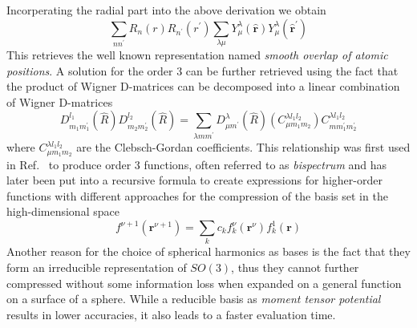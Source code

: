 Incorperating the radial part into the above derivation we obtain
\begin{equation}
  \sum_{nn^\prime} R_n(r)R_{n^\prime}(r^\prime) \sum_{\lambda\mu} Y^\lambda_\mu(\hat{\mathbf{r}})Y^\lambda_{\mu}(\hat{\mathbf{r}}^\prime)
\end{equation}
This retrieves the well known representation named \emph{smooth overlap of atomic positions}\cite{bartok2013representing}.
A solution for the order 3 can be further retrieved using the fact that the product of Wigner D-matrices can be decomposed into a linear combination of Wigner D-matrices
\begin{equation}
  D^{l_1}_{m_1m_1^\prime}(\hat{R})D^{l_2}_{m_2m_2^\prime}(\hat{R}) = \sum_{\lambda m m^\prime} D^{\lambda}_{\mu m^\prime}(\hat{R}) (C^{\lambda l_1l_2}_{\mu m_1m_2})C^{\lambda l_1l_2}_{mm_1^\prime m_2^\prime}
\end{equation}
where $C^{\lambda l_1l_2}_{\mu m_1m_2}$ are the Clebsch-Gordan coefficients\cite{yutsis1965theory}.
This relationship was first used in Ref.~\cite{bartok2013representing} to produce order 3 functions, often referred to as \emph{bispectrum} and has later been put into a recursive formula to create expressions for higher-order functions with different approaches for the compression of the basis set in the high-dimensional space\cite{kondor2018clebsch,yan2019fourier,nigam2020recursive}
\begin{equation}
  \label{eq:recursive_higherorder}
  f^{\nu+1}(\mathbf{r}^{\nu+1}) = \sum_{k} c_k f_k^\nu(\mathbf{r}^{\nu})f_k^1(\mathbf{r})%
\end{equation}
Another reason for the choice of spherical harmonics as bases is the fact that they form an irreducible representation of $SO(3)$, thus they cannot further compressed without some information loss when expanded on a general function on a surface of a sphere. %
While a reducible basis as \emph{moment tensor potential}\cite{shapeev2016moment} results in lower accuracies, it also leads to a faster evaluation time\cite{zuo2020performance,xie2023ultra}. %

